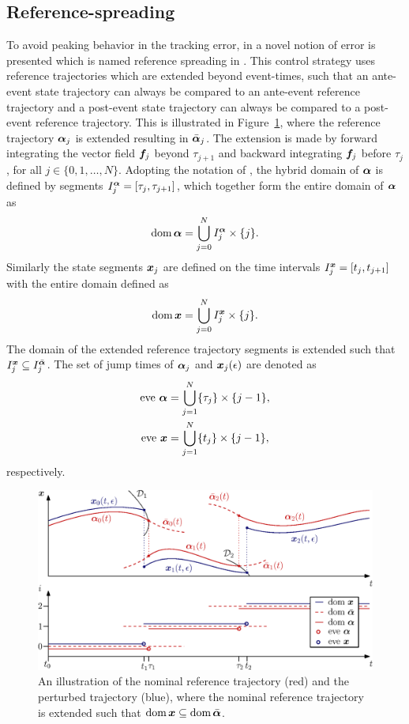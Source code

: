 \documentclass[../DC2017114Bouma.tex]{subfiles}
\begin{document}
\subsection{Reference-spreading}
To avoid peaking behavior in the tracking error, in \cite{Saccon2014} a novel notion of error is presented which is named reference spreading in \cite{Rijnen2016}. This control strategy uses reference trajectories which are extended beyond event-times, such that an ante-event state trajectory can always be compared to an ante-event reference trajectory and a post-event state trajectory can always be compared to a post-event reference trajectory. This is illustrated in Figure~\ref{fig:3refspread}, where the reference trajectory $\boldsymbol{\alpha}_j$ is extended resulting in $\bar{\boldsymbol{\alpha}}_j$. The extension is made by forward integrating the vector field ${\boldsymbol{f}}_j$ beyond $\tau_{j+1}$ and backward integrating ${\boldsymbol{f}}_j$ before $\tau_j$, for all $j\in\{0,1,\dots,N\}$. Adopting the notation of \cite{Goebel2009}, the hybrid domain of $\boldsymbol{\alpha}$ is defined by segments $I_j^{\boldsymbol{\alpha}} = [\tau_j,\tau_{j+1}]$, which together form the entire domain of $\boldsymbol{\alpha}$ as
\begin{align}
\operatorname{\textnormal{dom}}\boldsymbol{\alpha} = \bigcup^N_{j=0}I^{\boldsymbol{\alpha}}_j\times\{j\}.
\end{align}
%
Similarly the state segments ${\boldsymbol{x}}_j$ are defined on the time intervals $I_j^{\boldsymbol{x}} = [t_j,t_{j+1}]$ with the entire domain defined as
\begin{align}
\operatorname{\textnormal{dom}}{\boldsymbol{x}} = \bigcup^N_{j=0}I^{{\boldsymbol{x}}}_j\times\{j\}.
\end{align}
The domain of the extended reference trajectory segments is extended such that $I^{{\boldsymbol{x}}}_j\subseteq I^{\bar{\boldsymbol{\alpha}}}_j$. The set of jump times of $\boldsymbol{\alpha}_j$ and ${\boldsymbol{x}}_j(\epsilon)$ are denoted as
\begin{align}
\text{eve}\ \boldsymbol{\alpha} &= \bigcup_{j=1}^N \{\tau_j\}\times\{j-1\},\\
\text{eve}\ {\boldsymbol{x}} &= \bigcup_{j=1}^N \{t_j\}\times\{j-1\},
\end{align}
respectively.
\begin{figure}[h]
\centering
\includegraphics[width=.9\textwidth]{refspreaddom.eps}\caption{An illustration of the nominal reference trajectory (red) and the perturbed trajectory (blue), where the nominal reference trajectory is extended such that $\operatorname{\textnormal{dom}} {\boldsymbol{x}}\subseteq\operatorname{\textnormal{dom}} \bar{\boldsymbol{\alpha}}$.} \label{fig:3refspread}
\end{figure}
\end{document}
